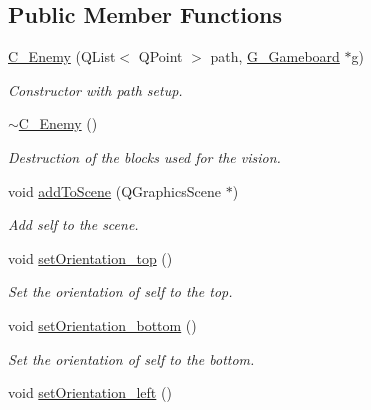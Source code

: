 \subsection*{Public Member Functions}
\begin{DoxyCompactItemize}
\item 
\hyperlink{class_c___enemy_aa558b403335f761a07e5c998bfdbfcf7}{C\+\_\+\+Enemy} (Q\+List$<$ Q\+Point $>$ path, \hyperlink{class_g___gameboard}{G\+\_\+\+Gameboard} $\ast$g)
\begin{DoxyCompactList}\small\item\em Constructor with path setup. \end{DoxyCompactList}\item 
\hypertarget{class_c___enemy_a12004d3ed4e2f8232b13fc9f85f4a87e}{}\hyperlink{class_c___enemy_a12004d3ed4e2f8232b13fc9f85f4a87e}{$\sim$\+C\+\_\+\+Enemy} ()\label{class_c___enemy_a12004d3ed4e2f8232b13fc9f85f4a87e}

\begin{DoxyCompactList}\small\item\em Destruction of the blocks used for the vision. \end{DoxyCompactList}\item 
\hypertarget{class_c___enemy_a4296ca16b6d9a1f49178a07b5b7b087e}{}void \hyperlink{class_c___enemy_a4296ca16b6d9a1f49178a07b5b7b087e}{add\+To\+Scene} (Q\+Graphics\+Scene $\ast$)\label{class_c___enemy_a4296ca16b6d9a1f49178a07b5b7b087e}

\begin{DoxyCompactList}\small\item\em Add self to the scene. \end{DoxyCompactList}\item 
\hypertarget{class_c___enemy_a6770756bf739e86895c66c32ee60d312}{}void \hyperlink{class_c___enemy_a6770756bf739e86895c66c32ee60d312}{set\+Orientation\+\_\+top} ()\label{class_c___enemy_a6770756bf739e86895c66c32ee60d312}

\begin{DoxyCompactList}\small\item\em Set the orientation of self to the top. \end{DoxyCompactList}\item 
\hypertarget{class_c___enemy_a5603772a907dea9a4969837d2b73ed0e}{}void \hyperlink{class_c___enemy_a5603772a907dea9a4969837d2b73ed0e}{set\+Orientation\+\_\+bottom} ()\label{class_c___enemy_a5603772a907dea9a4969837d2b73ed0e}

\begin{DoxyCompactList}\small\item\em Set the orientation of self to the bottom. \end{DoxyCompactList}\item 
\hypertarget{class_c___enemy_af4e50d2c9f0f346a9da351d4cdd6fa2d}{}void \hyperlink{class_c___enemy_af4e50d2c9f0f346a9da351d4cdd6fa2d}{set\+Orientation\+\_\+left} ()\label{class_c___enemy_af4e50d2c9f0f346a9da351d4cdd6fa2d}


\end{DoxyCompactItemize}
